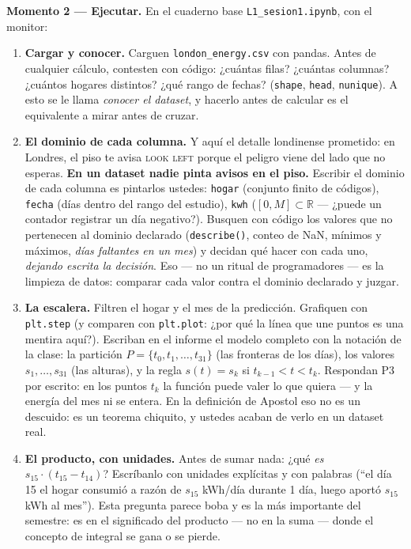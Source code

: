 \documentclass[12pt,letterpaper]{article}
\begin{document}
\textbf{Momento 2 --- Ejecutar.} En el cuaderno base \texttt{L1\_sesion1.ipynb}, con el monitor:

\begin{enumerate}[label=\arabic*.]
    \item \textbf{Cargar y conocer.} Carguen \texttt{london\_energy.csv} con pandas. Antes de cualquier cálculo, contesten con código: ¿cuántas filas? ¿cuántas columnas? ¿cuántos hogares distintos? ¿qué rango de fechas? (\texttt{shape}, \texttt{head}, \texttt{nunique}). A esto se le llama \emph{conocer el dataset}, y hacerlo antes de calcular es el equivalente a mirar antes de cruzar.
    \item \textbf{El dominio de cada columna.} Y aquí el detalle londinense prometido: en Londres, el piso te avisa \textsc{look left} porque el peligro viene del lado que no esperas. \textbf{En un dataset nadie pinta avisos en el piso.} Escribir el dominio de cada columna es pintarlos ustedes: \texttt{hogar} (conjunto finito de códigos), \texttt{fecha} (días dentro del rango del estudio), \texttt{kwh} ($[0,M]\subset\mathbb{R}$ --- ¿puede un contador registrar un día negativo?). Busquen con código los valores que no pertenecen al dominio declarado (\texttt{describe()}, conteo de NaN, mínimos y máximos, \emph{días faltantes en un mes}) y decidan qué hacer con cada uno, \emph{dejando escrita la decisión}. Eso --- no un ritual de programadores --- es la limpieza de datos: comparar cada valor contra el dominio declarado y juzgar.
    \item \textbf{La escalera.} Filtren el hogar y el mes de la predicción. Grafiquen con \texttt{plt.step} (y comparen con \texttt{plt.plot}: ¿por qué la línea que une puntos es una mentira aquí?). Escriban en el informe el modelo completo con la notación de la clase: la partición $P=\{t_0,t_1,\ldots,t_{31}\}$ (las fronteras de los días), los valores $s_1,\ldots,s_{31}$ (las alturas), y la regla $s(t)=s_k$ si $t_{k-1}<t<t_k$. Respondan P3 por escrito: en los puntos $t_k$ la función puede valer lo que quiera --- y la energía del mes ni se entera. En la definición de Apostol eso no es un descuido: es un teorema chiquito, y ustedes acaban de verlo en un dataset real.
    \item \textbf{El producto, con unidades.} Antes de sumar nada: ¿qué \emph{es} $s_{15}\cdot(t_{15}-t_{14})$? Escríbanlo con unidades explícitas y con palabras (``el día 15 el hogar consumió a razón de $s_{15}$ kWh/día durante 1 día, luego aportó $s_{15}$ kWh al mes''). Esta pregunta parece boba y es la más importante del semestre: es en el significado del producto --- no en la suma --- donde el concepto de integral se gana o se pierde.

\end{enumerate}
\end{document}
